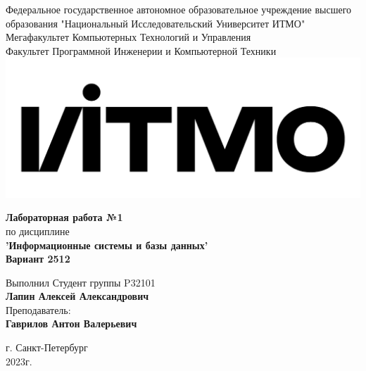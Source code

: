 \documentclass[12pt,onecolumn]{article}
\begin{document}
\setcounter{tocdepth}{4}
\begin{center}
    Федеральное государственное автономное образовательное учреждение высшего образования "Национальный Исследовательский Университет ИТМО"\\ 
    Мегафакультет Компьютерных Технологий и Управления\\
    Факультет Программной Инженерии и Компьютерной Техники \\
    \includegraphics[scale=0.3]{image/itmo.jpg} %
\end{center}
\vspace{1cm}


\begin{center}
    \textbf{Лабораторная работа №1}\\
    по дисциплине\\
    \textbf{'Информационные системы и базы данных'}\\
    \textbf{Вариант 2512}
\end{center}

\vspace{2cm}

\begin{flushright}
  Выполнил Студент  группы P32101\\
  \textbf{Лапин Алексей Александрович}\\
  Преподаватель: \\
  \textbf{Гаврилов Антон Валерьевич}\\
\end{flushright}

\vspace{6cm}
\begin{center}
    г. Санкт-Петербург\\
    2023г.
\end{center}

\newpage
\tableofcontents
\newpage
\end{document}
